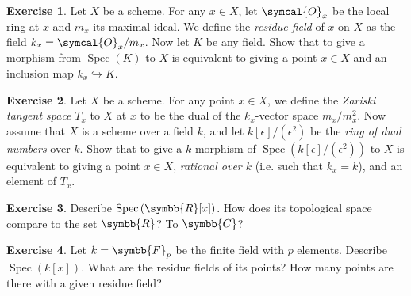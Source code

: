 \documentclass[a4paper, 12pt]{article}
\theoremstyle{definition}
\newtheorem{exercise}{Exercise}
\newcommand*{\Spec}[1]{\operatorname{Spec}\left(#1\right)}
\newcommand*{\reals}{\symbb{R}}
\newcommand*{\complex}{\symbb{C}}
\newcommand*{\finitefield}[1]{\symbb{F}_{#1}}
\newcommand*{\ring}{\symcal{O}}
\begin{document}
\setcounter{exercise}{6}

\begin{exercise}
Let \(X\) be a scheme. For any \(x \in X\), let \(\ring_{x}\) be the local ring at \(x\) and \(m_x\) its maximal ideal. We define the \emph{residue field} of \(x\) on \(X\) as the field \(k_x = \ring_x / m_x\). Now let \(K\) be any field. Show that to give a morphism from \(\Spec{K}\) to \(X\) is equivalent to giving a point \(x \in X\) and an inclusion map \(k_x \hookrightarrow K\).
\end{exercise}

\begin{exercise}
Let \(X\) be a scheme. For any point \(x \in X\), we define the \emph{Zariski tangent space} \(T_x\) to \(X\) at \(x\) to be the dual of the \(k_x\)-vector space \(m_x / m_x^2\). Now assume that \(X\) is a scheme over a field \(k\), and let \(k[\epsilon]/(\epsilon^2)\) be the \emph{ring of dual numbers} over \(k\). Show that to give a \(k\)-morphism of \(\Spec{k[\epsilon]/(\epsilon^2)}\) to \(X\) is equivalent to giving a point \(x \in X\), \emph{rational over \(k\)} (i.e. such that \(k_x = k\)), and an element of \(T_x\).
\end{exercise}

\setcounter{exercise}{9}

\begin{exercise}
Describe \(\Spec{\reals[x]}\). How does its topological space compare to the set \(\reals\)? To \(\complex\)?
\end{exercise}

\begin{exercise}
Let \(k = \finitefield{p}\) be the finite field with \(p\) elements. Describe \(\Spec{k[x]}\). What are the residue fields of its points? How many points are there with a given residue field?
\end{exercise}
\end{document}
